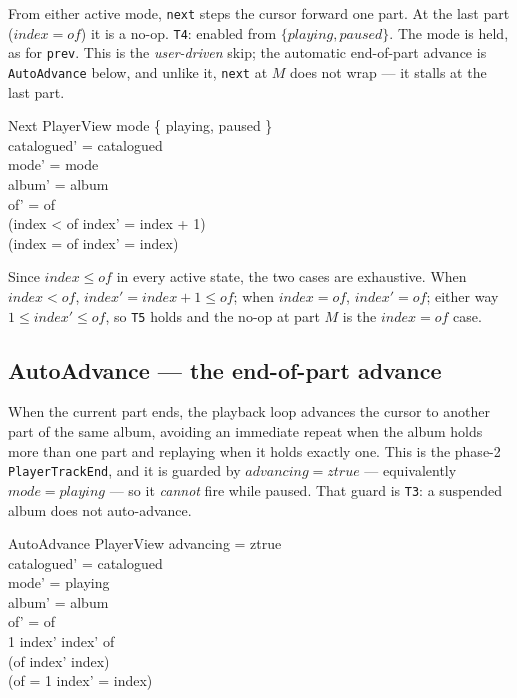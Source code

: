 \documentclass[a4paper,10pt,fleqn]{article}
\begin{document}
From either active mode, \texttt{next} steps the cursor forward one part. At the
last part ($index = of$) it is a no-op. \texttt{T4}: enabled from
$\{ playing, paused \}$. The mode is held, as for \texttt{prev}. This is the
\emph{user-driven} skip; the automatic end-of-part advance is
\texttt{AutoAdvance} below, and unlike it, \texttt{next} at $M$ does not wrap ---
it stalls at the last part.

\begin{schema}{Next}
  \Delta PlayerView
  \where
  mode \in \{ playing, paused \} \\
  catalogued' = catalogued \\
  mode' = mode \\
  album' = album \\
  of' = of \\
  (index < of \implies index' = index + 1) \\
  (index = of \implies index' = index)
\end{schema}

Since $index \leq of$ in every active state, the two cases are exhaustive. When
$index < of$, $index' = index + 1 \leq of$; when $index = of$, $index' = of$;
either way $1 \leq index' \leq of$, so \texttt{T5} holds and the no-op at part
$M$ is the $index = of$ case.

\subsection{AutoAdvance --- the end-of-part advance}
\label{sec:autoadvance}

When the current part ends, the playback loop advances the cursor to another
part of the same album, avoiding an immediate repeat when the album holds more
than one part and replaying when it holds exactly one. This is the phase-2
\texttt{PlayerTrackEnd}, and it is guarded by $advancing = ztrue$ --- equivalently
$mode = playing$ --- so it \emph{cannot} fire while paused. That guard is
\texttt{T3}: a suspended album does not auto-advance.

\begin{schema}{AutoAdvance}
  \Delta PlayerView
  \where
  advancing = ztrue \\
  catalogued' = catalogued \\
  mode' = playing \\
  album' = album \\
  of' = of \\
  1 \leq index' \land index' \leq of \\
  (of  \implies index' \neq index) \\
  (of = 1 \implies index' = index)
\end{schema}
\end{document}
